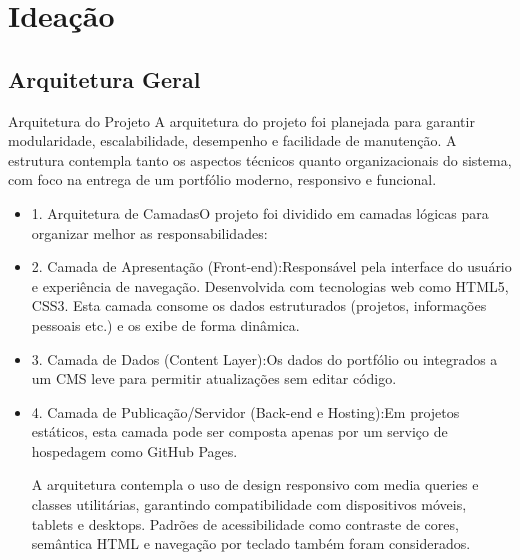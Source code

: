 \section{Ideação}

\subsection{Arquitetura Geral}
Arquitetura do Projeto
A arquitetura do projeto foi planejada para garantir modularidade, escalabilidade, desempenho e facilidade de manutenção. A estrutura contempla tanto os aspectos técnicos quanto organizacionais do sistema, com foco na entrega de um portfólio moderno, responsivo e funcional.
\begin{itemize}


\item 1. Arquitetura de CamadasO projeto foi dividido em camadas lógicas para organizar melhor as responsabilidades:
\item 2. Camada de Apresentação (Front-end):Responsável pela interface do usuário e experiência de navegação. Desenvolvida com tecnologias web como HTML5, CSS3. Esta camada consome os dados estruturados (projetos, informações pessoais etc.) e os exibe de forma dinâmica.
\item 3. Camada de Dados (Content Layer):Os dados do portfólio ou integrados a um CMS leve para permitir atualizações sem editar código.
\item 4. Camada de Publicação/Servidor (Back-end e Hosting):Em projetos estáticos, esta camada pode ser composta apenas por um serviço de hospedagem como GitHub Pages. 

A arquitetura contempla o uso de design responsivo com media queries e classes utilitárias, garantindo compatibilidade com dispositivos móveis, tablets e desktops. Padrões de acessibilidade como contraste de cores, semântica HTML e navegação por teclado também foram considerados.

\end{itemize}

 	




